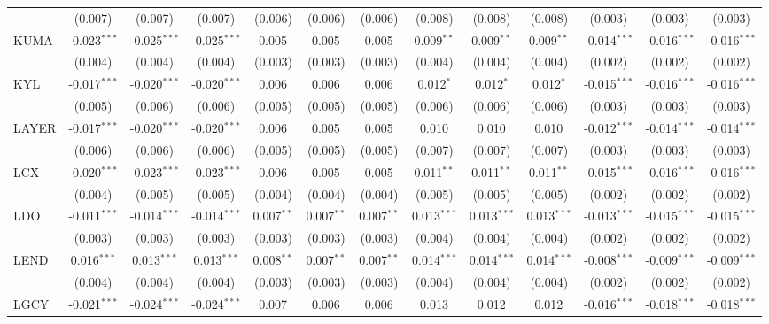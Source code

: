 \begin{table}[!htbp]
\begin{tabular}{@{\extracolsep{5pt}}lcccccccccccc}
  & (0.007) & (0.007) & (0.007) & (0.006) & (0.006) & (0.006) & (0.008) & (0.008) & (0.008) & (0.003) & (0.003) & (0.003) \\
 KUMA & -0.023$^{***}$ & -0.025$^{***}$ & -0.025$^{***}$ & 0.005$^{}$ & 0.005$^{}$ & 0.005$^{}$ & 0.009$^{**}$ & 0.009$^{**}$ & 0.009$^{**}$ & -0.014$^{***}$ & -0.016$^{***}$ & -0.016$^{***}$ \\
  & (0.004) & (0.004) & (0.004) & (0.003) & (0.003) & (0.003) & (0.004) & (0.004) & (0.004) & (0.002) & (0.002) & (0.002) \\
 KYL & -0.017$^{***}$ & -0.020$^{***}$ & -0.020$^{***}$ & 0.006$^{}$ & 0.006$^{}$ & 0.006$^{}$ & 0.012$^{*}$ & 0.012$^{*}$ & 0.012$^{*}$ & -0.015$^{***}$ & -0.016$^{***}$ & -0.016$^{***}$ \\
  & (0.005) & (0.006) & (0.006) & (0.005) & (0.005) & (0.005) & (0.006) & (0.006) & (0.006) & (0.003) & (0.003) & (0.003) \\
 LAYER & -0.017$^{***}$ & -0.020$^{***}$ & -0.020$^{***}$ & 0.006$^{}$ & 0.005$^{}$ & 0.005$^{}$ & 0.010$^{}$ & 0.010$^{}$ & 0.010$^{}$ & -0.012$^{***}$ & -0.014$^{***}$ & -0.014$^{***}$ \\
  & (0.006) & (0.006) & (0.006) & (0.005) & (0.005) & (0.005) & (0.007) & (0.007) & (0.007) & (0.003) & (0.003) & (0.003) \\
 LCX & -0.020$^{***}$ & -0.023$^{***}$ & -0.023$^{***}$ & 0.006$^{}$ & 0.005$^{}$ & 0.005$^{}$ & 0.011$^{**}$ & 0.011$^{**}$ & 0.011$^{**}$ & -0.015$^{***}$ & -0.016$^{***}$ & -0.016$^{***}$ \\
  & (0.004) & (0.005) & (0.005) & (0.004) & (0.004) & (0.004) & (0.005) & (0.005) & (0.005) & (0.002) & (0.002) & (0.002) \\
 LDO & -0.011$^{***}$ & -0.014$^{***}$ & -0.014$^{***}$ & 0.007$^{**}$ & 0.007$^{**}$ & 0.007$^{**}$ & 0.013$^{***}$ & 0.013$^{***}$ & 0.013$^{***}$ & -0.013$^{***}$ & -0.015$^{***}$ & -0.015$^{***}$ \\
  & (0.003) & (0.003) & (0.003) & (0.003) & (0.003) & (0.003) & (0.004) & (0.004) & (0.004) & (0.002) & (0.002) & (0.002) \\
 LEND & 0.016$^{***}$ & 0.013$^{***}$ & 0.013$^{***}$ & 0.008$^{**}$ & 0.007$^{**}$ & 0.007$^{**}$ & 0.014$^{***}$ & 0.014$^{***}$ & 0.014$^{***}$ & -0.008$^{***}$ & -0.009$^{***}$ & -0.009$^{***}$ \\
  & (0.004) & (0.004) & (0.004) & (0.003) & (0.003) & (0.003) & (0.004) & (0.004) & (0.004) & (0.002) & (0.002) & (0.002) \\
 LGCY & -0.021$^{***}$ & -0.024$^{***}$ & -0.024$^{***}$ & 0.007$^{}$ & 0.006$^{}$ & 0.006$^{}$ & 0.013$^{}$ & 0.012$^{}$ & 0.012$^{}$ & -0.016$^{***}$ & -0.018$^{***}$ & -0.018$^{***}$ \\

\end{tabular}
\end{table}

